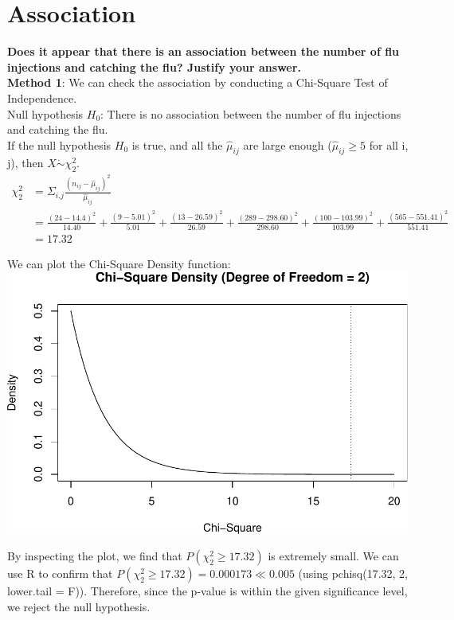 \documentclass[
]{book}
\begin{document}
\section{Association}\label{association}

\textbf{Does it appear that there is an association between the number of flu injections and catching the flu? Justify your answer.}\\

\textbf{Method 1}: We can check the association by conducting a Chi-Square Test of Independence.\\
Null hypothesis \(H_0\): There is no association between the number of flu injections and catching the flu.\\
If the null hypothesis \(H_0\) is true, and all the \(\hat{\mu}_{ij}\) are large enough (\(\hat{\mu}_{ij} \geq 5\) for all i, j), then \(X \mathrel{\dot\sim} \chi_{2}^{2}\).
\[\begin{aligned}
  \chi_{2}^{2} &= \Sigma_{i.j} \frac{(n_{ij} - \hat{\mu}_{ij})^2}{\hat{\mu}_{ij}} \\
  &= \frac{(24 - 14.4)^2}{14.40} + \frac{(9 - 5.01)^2}{5.01} + \frac{(13-26.59)^2}{26.59} + \frac{(289 - 298.60)^2}{298.60} + \frac{(100 - 103.99)^2}{103.99} + \frac{(565 - 551.41)^2}{551.41} \\
  &= 17.32
\end{aligned}\]

We can plot the Chi-Square Density function:\\

\includegraphics{_main_files/figure-latex/unnamed-chunk-13-1.pdf}

By inspecting the plot, we find that \(P(\chi_{2}^{2} \geq 17.32)\) is extremely small. We can use R to confirm that \(P(\chi_{2}^{2} \geq 17.32) = 0.000173 \ll 0.005\) (using pchisq(17.32, 2, lower.tail = F)). Therefore, since the p-value is within the given significance level, we reject the null hypothesis.
\end{document}
